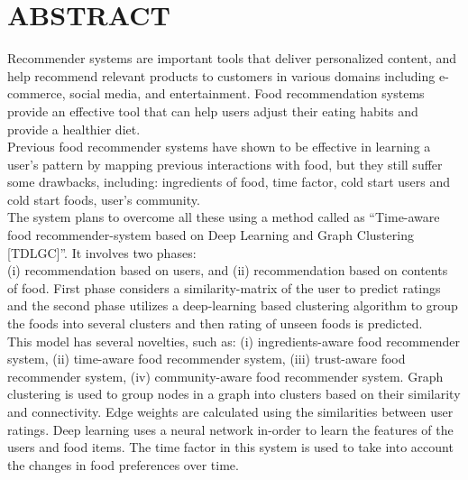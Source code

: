 \section*{\centering ABSTRACT}
\indent Recommender systems are important tools that deliver personalized content, and help recommend relevant products to customers in various domains including e-commerce, social media, and entertainment. Food recommendation systems provide an effective tool that can help users adjust their eating habits and provide a healthier diet.
\\
\indent Previous food recommender systems have shown to be effective in learning a user’s pattern by mapping previous interactions with food, but they still suffer some drawbacks, including: ingredients of food, time factor, cold start users and cold start foods, user’s community.
\\
\indent The system plans to overcome all these using a method called as “Time-aware food recommender-system based on Deep Learning and Graph Clustering [TDLGC]”\cite*{9775081}. It involves two phases: \\(i) recommendation based on users, and (ii) recommendation based on contents of food. First phase considers a similarity-matrix of the user to predict ratings and the second phase utilizes a deep-learning based clustering algorithm to group the foods into several clusters and then rating of unseen foods is predicted.
\\
\indent This  model has several novelties, such as: (i) ingredients-aware food recommender system, (ii) time-aware food recommender system, (iii) trust-aware food recommender system, (iv) community-aware food recommender system. Graph clustering is used to group nodes in a graph into clusters based on their similarity and connectivity. Edge weights are calculated using the similarities between user ratings. Deep learning uses a neural network in-order to learn the features of the users and food items. The time factor in this system is used to take into account the changes in food preferences over time.